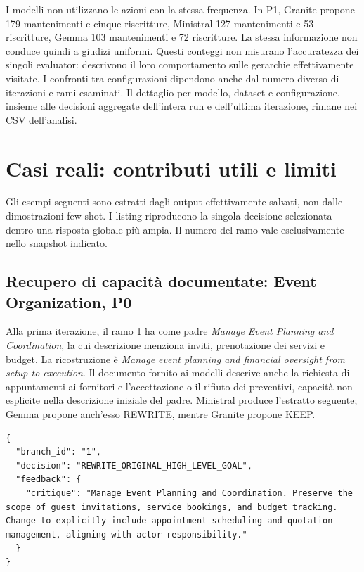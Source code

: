 I modelli non utilizzano le azioni con la stessa frequenza.
In P1, Granite propone 179 mantenimenti e cinque riscritture,
Ministral 127 mantenimenti e 53 riscritture, Gemma 103 mantenimenti
e 72 riscritture. La stessa informazione non conduce quindi a
giudizi uniformi. Questi conteggi non misurano l'accuratezza dei
singoli evaluator: descrivono il loro comportamento sulle gerarchie
effettivamente visitate. I confronti tra configurazioni dipendono
anche dal numero diverso di iterazioni e rami esaminati. Il dettaglio
per modello, dataset e configurazione, insieme alle decisioni aggregate
dell'intera run e dell'ultima iterazione, rimane nei CSV dell'analisi.

\section{Casi reali: contributi utili e limiti}
Gli esempi seguenti sono estratti dagli output effettivamente salvati,
non dalle dimostrazioni few-shot. I listing riproducono la singola
decisione selezionata dentro una risposta globale pi\`u ampia.
Il numero del ramo vale esclusivamente nello snapshot indicato.

\subsection{Recupero di capacit\`a documentate: Event Organization, P0}
Alla prima iterazione, il ramo 1 ha come padre
\emph{Manage Event Planning and Coordination}, la cui descrizione
menziona inviti, prenotazione dei servizi e budget. La ricostruzione
\`e \emph{Manage event planning and financial oversight from setup
to execution}. Il documento fornito ai modelli descrive anche la
richiesta di appuntamenti ai fornitori e l'accettazione o il rifiuto
dei preventivi, capacit\`a non esplicite nella descrizione iniziale
del padre. Ministral produce l'estratto seguente; Gemma propone
anch'esso REWRITE, mentre Granite propone KEEP.

\begin{lstlisting}[style=llmjson,caption={Decisione reale di Ministral: Event Organization, P0, iterazione 1, ramo 1.},label={lst:results-event-rewrite}]
{
  "branch_id": "1",
  "decision": "REWRITE_ORIGINAL_HIGH_LEVEL_GOAL",
  "feedback": {
    "critique": "Manage Event Planning and Coordination. Preserve the scope of guest invitations, service bookings, and budget tracking. Change to explicitly include appointment scheduling and quotation management, aligning with actor responsibility."
  }
}
\end{lstlisting}


